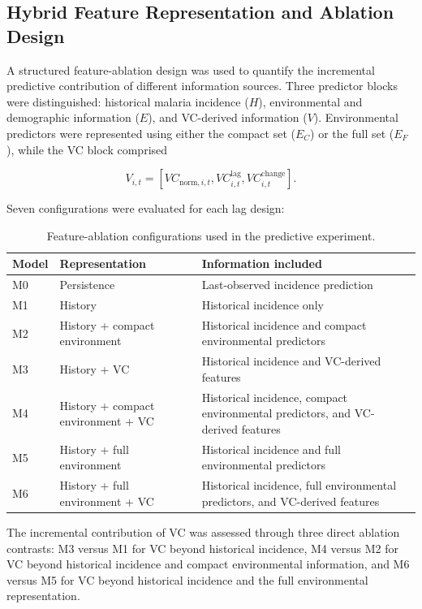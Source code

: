 \documentclass[10pt,twocolumn]{article}
\begin{document}
\subsection{Hybrid Feature Representation and Ablation Design}

A structured feature-ablation design was used to quantify the
incremental predictive contribution of different information sources.
Three predictor blocks were distinguished: historical malaria
incidence (\(H\)), environmental and demographic information (\(E\)),
and VC-derived information (\(V\)). Environmental predictors were
represented using either the compact set (\(E_C\)) or the full set
(\(E_F\)), while the VC block comprised

\begin{equation}
V_{i,t}
=
\left[
VC_{\mathrm{norm},i,t},
VC^{\mathrm{lag}}_{i,t},
VC^{\mathrm{change}}_{i,t}
\right].
\label{eq:vc_block}
\end{equation}

Seven configurations were evaluated for each lag design:

\begin{table}[!t]
\centering
\caption{Feature-ablation configurations used in the predictive
experiment.}
\label{tab:ablation_design}
\begin{tabular}{p{}p{}
                p{}}
\toprule
Model & Representation & Information included \\
\midrule
M0 & Persistence & Last-observed incidence prediction \\
M1 & History & Historical incidence only \\
M2 & History + compact environment &
Historical incidence and compact environmental predictors \\
M3 & History + VC &
Historical incidence and VC-derived features \\
M4 & History + compact environment + VC &
Historical incidence, compact environmental predictors, and
VC-derived features \\
M5 & History + full environment &
Historical incidence and full environmental predictors \\
M6 & History + full environment + VC &
Historical incidence, full environmental predictors, and
VC-derived features \\
\bottomrule
\end{tabular}
\end{table}

The incremental contribution of VC was assessed through three direct
ablation contrasts: M3 versus M1 for VC beyond historical incidence,
M4 versus M2 for VC beyond historical incidence and compact
environmental information, and M6 versus M5 for VC beyond historical
incidence and the full environmental representation.
\end{document}
